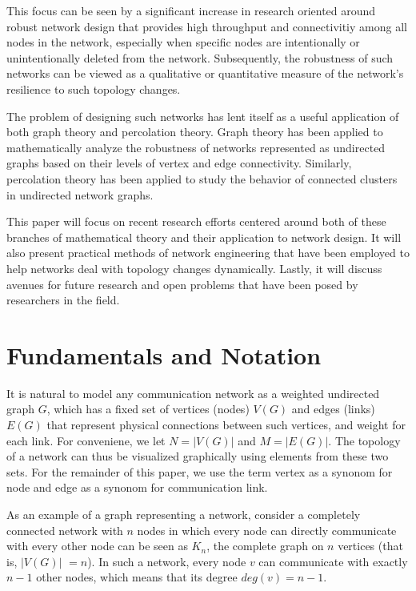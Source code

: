\documentclass[11pt]{article}
\begin{document}
This focus can be seen by a significant increase in research oriented around robust network design that provides high throughput and connectivitiy among all nodes in the network, especially when specific nodes are intentionally or unintentionally deleted from the network. Subsequently, the robustness of such networks can be viewed as a qualitative or quantitative measure of the network's resilience to such topology changes.

The problem of designing such networks has lent itself as a useful application of both graph theory and percolation theory. Graph theory has been applied to mathematically analyze the robustness of networks represented as undirected graphs based on their levels of vertex and edge connectivity. Similarly, percolation theory has been applied to study the behavior of connected clusters in undirected network graphs. 

This paper will focus on recent research efforts centered around both of these branches of 
mathematical theory and their application to network design. It will also present practical methods of
network engineering that have been employed to help networks deal with topology changes dynamically.
Lastly, it will discuss avenues for future research and open problems that have been posed by 
researchers in the field.

\section{Fundamentals and Notation}

It is natural to model any communication network as a weighted undirected graph $G$, which has a fixed 
set of vertices (nodes) $V(G)$ and edges (links) $E(G)$ that represent physical connections between such vertices, and weight for each link. For conveniene, we let $N = |V(G)|$ and $M = |E(G)|$. The topology of a network can thus be visualized graphically using elements from these two sets. For the remainder of this paper, we use the term vertex as a synonom for node and edge as a synonom for communication link. 

As an example of a graph representing a network, consider a completely connected network with $n$ nodes in which every node can directly communicate with every other node can be seen as $K_{n}$, the complete graph on $n$ vertices (that is, $|V(G)|$ $= n$). In such a network, every node $v$ can communicate with exactly $n-1$ other nodes, which means that its degree $deg(v) = n-1$. 
\end{document}
